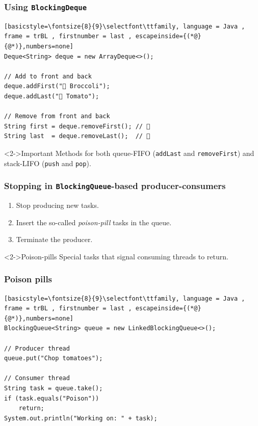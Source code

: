 \documentclass[xcolor={dvipsnames,svgnames},aspectratio=169]{beamer}
\begin{document}
\begin{frame}[fragile]
  \frametitle{Using \texttt{BlockingDeque}}
\begin{lstlisting}[basicstyle=\fontsize{8}{9}\selectfont\ttfamily, language = Java ,
frame = trBL , firstnumber = last , escapeinside={(*@}{@*)},numbers=none]
Deque<String> deque = new ArrayDeque<>();

// Add to front and back
deque.addFirst("🥦 Broccoli");
deque.addLast("🍅 Tomato");

// Remove from front and back
String first = deque.removeFirst(); // 🥦
String last  = deque.removeLast();  // 🍅
\end{lstlisting}
  \begin{block}<2->{\faLightbulb \quad Important}
    Methods for both queue-FIFO (\texttt{addLast} and \texttt{removeFirst}) and
    stack-LIFO (\texttt{push} and \texttt{pop}).
  \end{block}

\end{frame}

\begin{frame}[fragile]
  \frametitle{Stopping  in \texttt{BlockingQueue}-based producer-consumers}

  \begin{enumerate}
  \item Stop producing new tasks.
  \item Insert the so-called \emph{poison-pill} tasks in the queue.
  \item Terminate the producer.
  \end{enumerate}
  \vspace{0.6cm}
  \begin{block}<2->{\faSkullCrossbones \quad Poison-pills}
    Special tasks that signal consuming threads to return.
  \end{block}
\end{frame}

\begin{frame}[fragile]
  \frametitle{Poison pills}

  \begin{lstlisting}[basicstyle=\fontsize{8}{9}\selectfont\ttfamily, language = Java ,
frame = trBL , firstnumber = last , escapeinside={(*@}{@*)},numbers=none]
BlockingQueue<String> queue = new LinkedBlockingQueue<>();

// Producer thread
queue.put("Chop tomatoes");

// Consumer thread
String task = queue.take();
if (task.equals("Poison"))
    return;
System.out.println("Working on: " + task);

\end{lstlisting}
\end{frame}
\end{document}
